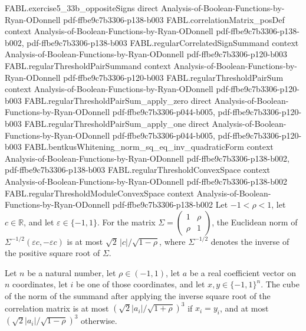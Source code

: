 \begin{theorem}
\proofstep
  {FABL.exercise5_33b_oppositeSigns}
  {direct}
  {Analysis-of-Boolean-Functions-by-Ryan-ODonnell}
  {pdf-ffbe9c7b3306-p138-b003}
\proofstep
  {FABL.correlationMatrix_posDef}
  {context}
  {Analysis-of-Boolean-Functions-by-Ryan-ODonnell}
  {pdf-ffbe9c7b3306-p138-b002,
    pdf-ffbe9c7b3306-p138-b003}
\proofstep
  {FABL.regularCorrelatedSignSummand}
  {context}
  {Analysis-of-Boolean-Functions-by-Ryan-ODonnell}
  {pdf-ffbe9c7b3306-p120-b003}
\proofstep
  {FABL.regularThresholdPairSummand}
  {context}
  {Analysis-of-Boolean-Functions-by-Ryan-ODonnell}
  {pdf-ffbe9c7b3306-p120-b003}
\proofstep
  {FABL.regularThresholdPairSum}
  {context}
  {Analysis-of-Boolean-Functions-by-Ryan-ODonnell}
  {pdf-ffbe9c7b3306-p120-b003}
\proofstep
  {FABL.regularThresholdPairSum_apply_zero}
  {direct}
  {Analysis-of-Boolean-Functions-by-Ryan-ODonnell}
  {pdf-ffbe9c7b3306-p044-b005,
    pdf-ffbe9c7b3306-p120-b003}
\proofstep
  {FABL.regularThresholdPairSum_apply_one}
  {direct}
  {Analysis-of-Boolean-Functions-by-Ryan-ODonnell}
  {pdf-ffbe9c7b3306-p044-b005,
    pdf-ffbe9c7b3306-p120-b003}
\proofstep
  {FABL.bentkusWhitening_norm_sq_eq_inv_quadraticForm}
  {context}
  {Analysis-of-Boolean-Functions-by-Ryan-ODonnell}
  {pdf-ffbe9c7b3306-p138-b002,
    pdf-ffbe9c7b3306-p138-b003}
\proofstep
  {FABL.regularThresholdConvexSpace}
  {context}
  {Analysis-of-Boolean-Functions-by-Ryan-ODonnell}
  {pdf-ffbe9c7b3306-p138-b002}
\proofstep
  {FABL.regularThresholdModuleConvexSpace}
  {context}
  {Analysis-of-Boolean-Functions-by-Ryan-ODonnell}
  {pdf-ffbe9c7b3306-p138-b002}
Let $-1<\rho<1$, let $c\in\mathbb{R}$, and let $\varepsilon\in\{-1,1\}$. For the matrix
$\Sigma=\begin{pmatrix}1&\rho\\\rho&1\end{pmatrix}$, the Euclidean norm of
$\Sigma^{-1/2}(\varepsilon c,-\varepsilon c)$ is at most $\sqrt{2}\,|c|/\sqrt{1-\rho}$,
where $\Sigma^{-1/2}$ denotes the inverse of the positive square root of $\Sigma$.
\end{theorem}

\begin{theorem}
\label{FABL.regularThresholdPairSummand_whitening_norm_cube_le}
\leanok
{}
Let $n$ be a natural number, let $\rho\in(-1,1)$, let $a$ be a real coefficient vector
on $n$ coordinates, let $i$ be one of those coordinates, and let $x,y\in\{-1,1\}^n$. The
cube of the norm of the summand after applying the inverse square root of the
correlation matrix is at most $(\sqrt{2}|a_i|/\sqrt{1+\rho})^3$ if $x_i=y_i$, and at
most $(\sqrt{2}|a_i|/\sqrt{1-\rho})^3$ otherwise.
\end{theorem}

